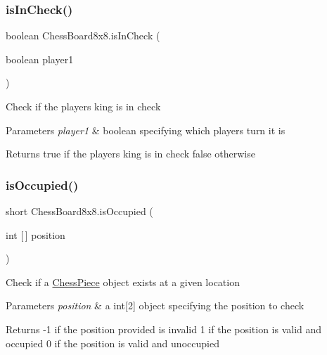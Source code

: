 \subsubsection{\texorpdfstring{is\+In\+Check()}{isInCheck()}}
{\footnotesize\ttfamily boolean Chess\+Board8x8.\+is\+In\+Check (\begin{DoxyParamCaption}\item[{boolean}]{player1 }\end{DoxyParamCaption})}

Check if the player\textquotesingle{}s king is in \textquotesingle{}check\textquotesingle{} 
\begin{DoxyParams}{Parameters}
{\em player1} & boolean specifying which player\textquotesingle{}s turn it is \\
\hline
\end{DoxyParams}
\begin{DoxyReturn}{Returns}
true if the player\textquotesingle{}s king is in check false otherwise 
\end{DoxyReturn}
\mbox{\label{class_chess_board8x8_a699c6504705da71bab0662d5d92af5ce}} 
\subsubsection{\texorpdfstring{is\+Occupied()}{isOccupied()}}
{\footnotesize\ttfamily short Chess\+Board8x8.\+is\+Occupied (\begin{DoxyParamCaption}\item[{int \mbox{[}$\,$\mbox{]}}]{position }\end{DoxyParamCaption})}

Check if a \mbox{\hyperlink{class_chess_piece}{Chess\+Piece}} object exists at a given location 
\begin{DoxyParams}{Parameters}
{\em position} & a int\mbox{[}2\mbox{]} object specifying the position to check \\
\hline
\end{DoxyParams}
\begin{DoxyReturn}{Returns}
-\/1 if the position provided is invalid 1 if the position is valid and occupied 0 if the position is valid and unoccupied 
\end{DoxyReturn}
\mbox{\label{class_chess_board8x8_ad1846ea32668dc608ff39112141a4182}} 
